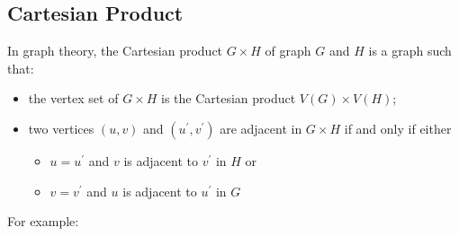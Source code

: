 \subsection{Cartesian Product}
In graph theory, the Cartesian product \(G \times H\) of graph \(G\) and \(H\) is a graph such that:
\begin{itemize}
  \item the vertex set of \(G \times H\) is the Cartesian product \(V(G) \times V(H)\);
  \item two vertices \((u, v)\) and \((u^{\prime} , v^{\prime})\) are adjacent in \(G \times H\) if and only if either
  \begin{itemize}
    \item \(u = u^{\prime}\) and \(v\) is adjacent to \(v^{\prime}\) in \(H\) or 
    \item \(v = v^{\prime}\) and \(u\) is adjacent to \(u^{\prime}\) in \(G\)
  \end{itemize}
\end{itemize}
For example:

